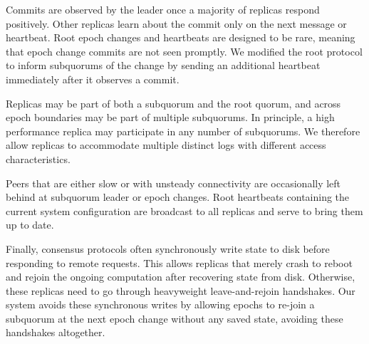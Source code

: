 \documentclass[letterpaper,10pt,twocolumn]{article}
\newcommand{\sub}{subquorum\xspace}
\newcommand{\subs}{subquorums\xspace}
\newcommand{\roo}{root quorum\xspace}
\newcommand{\hmm}[1]{}%
\begin{document}
Commits are observed by the leader once a majority of replicas respond
positively.
Other replicas learn about the commit only on the next message or heartbeat.
Root epoch changes and heartbeats are designed to be rare, meaning that epoch
change commits are not seen promptly.
We modified the root protocol to inform \subs of the change by sending an
additional heartbeat immediately after it observes a commit.

Replicas may be part of both a \sub and the \roo, and across epoch boundaries
may be part of multiple \subs.
In principle, a high performance replica may participate in any number of
\subs.
We therefore allow replicas to accommodate multiple distinct logs with
different access characteristics.

Peers that are either slow or with unsteady connectivity are occasionally left
behind at \sub leader or epoch changes.
Root heartbeats containing the current system configuration are broadcast to
all replicas and serve to bring them up to date.

Finally, consensus protocols often synchronously write state to disk before
responding to remote requests.
This allows replicas that merely crash to reboot and rejoin the ongoing
computation after recovering state from disk.
Otherwise, these replicas need to go through heavyweight leave-and-rejoin
handshakes.
Our system avoids these synchronous writes by allowing epochs to re-join a
\sub at the next epoch change without any saved state, avoiding these
handshakes altogether.


\hmm{
- anti-entropy  (two ints)
  - will be merkle trees
  - key-value store level
  - why
    - all doing is speeding up handoff
    - durability
- separate logs
- root leader doesn't change unless he dies, survives effect root quorum
changes.

\begin{equation}
tick = 2 * \lambda_\mu + 4 * \lambda_\sigma
\end{equation}
- delegations survive sub changes

- mark on ack does delegate

- hot spares are part of the vote  100\%  replicas participate

- so by sending to all
  - we are only listening to 3, rather than more w/ possibility of being
  slowed by slowest members
  - fastest responders will be elected leaders in subs (ben says natural)
  - but we nominate (as optimization)
    - root keeps track of who responds first

root
- two separate commands
}
\end{document}
